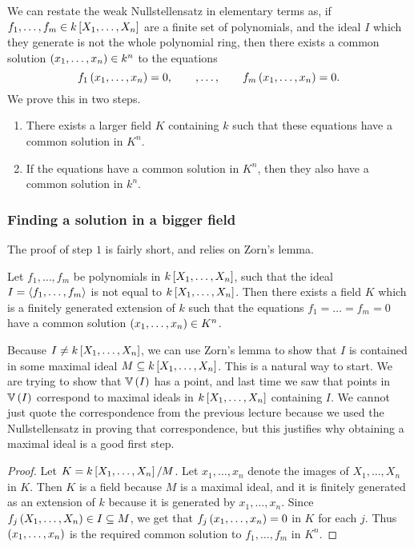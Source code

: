 
We can restate the weak Nullstellensatz in elementary terms as, if $ f_1, \dots, f_m \in k\sbr{X_1, \dots, X_n} $ are a finite set of polynomials, and the ideal $ I $ which they generate is not the whole polynomial ring, then there exists a common solution $ \br{x_1, \dots, x_n} \in k^n $ to the equations
$$ f_1\br{x_1, \dots, x_n} = 0, \qquad, \dots, \qquad f_m\br{x_1, \dots, x_n} = 0. $$
We prove this in two steps.
\begin{enumerate}[label=Step \arabic*., leftmargin=0.5in]
\item There exists a larger field $ K $ containing $ k $ such that these equations have a common solution in $ K^n $.
\item If the equations have a common solution in $ K^n $, then they also have a common solution in $ k^n $.
\end{enumerate}

\subsubsection{Finding a solution in a bigger field}

The proof of step $ 1 $ is fairly short, and relies on Zorn's lemma.

\begin{lemma}
Let $ f_1, \dots, f_m $ be polynomials in $ k\sbr{X_1, \dots, X_n} $, such that the ideal $ I = \left\langle f_1, \dots, f_m \right\rangle $ is not equal to $ k\sbr{X_1, \dots, X_n} $. Then there exists a field $ K $ which is a finitely generated extension of $ k $ such that the equations $ f_1 = \dots = f_m = 0 $ have a common solution $ \br{x_1, \dots, x_n} \in K^n $.
\end{lemma}

Because $ I \ne k\sbr{X_1, \dots, X_n} $, we can use Zorn's lemma to show that $ I $ is contained in some maximal ideal $ M \subseteq k\sbr{X_1, \dots, X_n} $. This is a natural way to start. We are trying to show that $ \VV\br{I} $ has a point, and last time we saw that points in $ \VV\br{I} $ correspond to maximal ideals in $ k\sbr{X_1, \dots, X_n} $ containing $ I $. We cannot just quote the correspondence from the previous lecture because we used the Nullstellensatz in proving that correspondence, but this justifies why obtaining a maximal ideal is a good first step.

\begin{proof}
Let $ K = k\sbr{X_1, \dots, X_n} / M $. Let $ x_1, \dots, x_n $ denote the images of $ X_1, \dots, X_n $ in $ K $. Then $ K $ is a field because $ M $ is a maximal ideal, and it is finitely generated as an extension of $ k $ because it is generated by $ x_1, \dots, x_n $. Since $ f_j\br{X_1, \dots, X_n} \in I \subseteq M $, we get that $ f_j\br{x_1, \dots, x_n} = 0 $ in $ K $ for each $ j $. Thus $ \br{x_1, \dots, x_n} $ is the required common solution to $ f_1, \dots, f_m $ in $ K^n $.
\end{proof}

